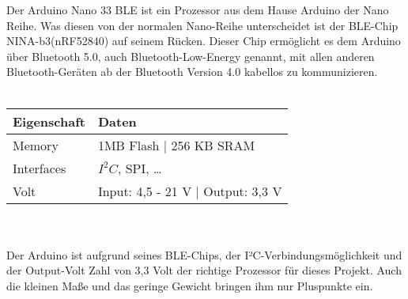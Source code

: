 Der Arduino Nano 33 BLE ist ein Prozessor aus dem Hause Arduino
der Nano Reihe. Was diesen von der normalen Nano-Reihe unterscheidet ist der BLE-Chip
NINA-b3(nRF52840) auf seinem Rücken. Dieser Chip ermöglicht es dem Arduino über 
Bluetooth 5.0, auch Bluetooth-Low-Energy genannt, mit allen anderen Bluetooth-Geräten ab 
der Bluetooth Version 4.0 kabellos zu kommunizieren.\\
\\
\begin{tabularx}{0.8\textwidth}{l|X}
Eigenschaft & Daten \\
\hline
Memory & 1MB Flash | 256 KB SRAM \\ 

Interfaces & $I^2C$, SPI, \dots \\

Volt & Input: 4,5 - 21 V | Output: 3,3 V\\
\end{tabularx}
\\
\\
Der Arduino ist aufgrund seines BLE-Chips, der I²C-Verbindungsmöglichkeit und der 
Output-Volt Zahl von 3,3 Volt der richtige Prozessor für dieses Projekt. Auch die 
kleinen Maße und das geringe Gewicht bringen ihm nur Pluspunkte ein.


